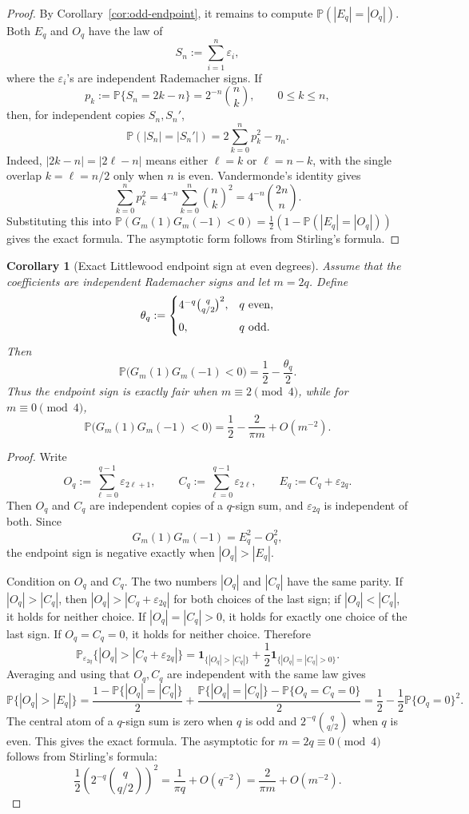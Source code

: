 \documentclass[11pt]{article}
\newtheorem{corollary}[theorem]{Corollary}
\newcommand{\PP}{\mathbb{P}}
\begin{document}
\begin{proof}
By Corollary~\ref{cor:odd-endpoint}, it remains to compute
\(\PP(|E_q|=|O_q|)\).  Both \(E_q\) and \(O_q\) have the law of
\[
S_n:=\sum_{i=1}^{n}\varepsilon_i,
\]
where the \(\varepsilon_i\)'s are independent Rademacher signs.  If
\[
p_k:=\PP\{S_n=2k-n\}=2^{-n}\binom nk,\qquad 0\le k\le n,
\]
then, for independent copies \(S_n,S_n'\),
\[
\PP(|S_n|=|S_n'|)
=2\sum_{k=0}^{n}p_k^2-\eta_n .
\]
Indeed, \(|2k-n|=|2\ell-n|\) means either \(\ell=k\) or \(\ell=n-k\), with the
single overlap \(k=\ell=n/2\) only when \(n\) is even.  Vandermonde's identity
gives
\[
\sum_{k=0}^{n}p_k^2
=4^{-n}\sum_{k=0}^{n}\binom nk^2
=4^{-n}\binom{2n}{n}.
\]
Substituting this into
\(\PP(G_m(1)G_m(-1)<0)=\tfrac12(1-\PP(|E_q|=|O_q|))\) gives the exact formula.
The asymptotic form follows from Stirling's formula.
\end{proof}

\begin{corollary}[Exact Littlewood endpoint sign at even degrees]\label{cor:littlewood-even}
Assume that the coefficients are independent Rademacher signs and let
\(m=2q\).  Define
\[
  \theta_q:=
  \begin{cases}
  4^{-q}\binom{q}{q/2}^{2},& q\ {\rm even},\\[2mm]
  0,& q\ {\rm odd}.
  \end{cases}
\]
Then
\[
\PP\bigl(G_m(1)G_m(-1)<0\bigr)=\frac12-\frac{\theta_q}{2}.
\]
Thus the endpoint sign is exactly fair when \(m\equiv2\pmod4\), while for
\(m\equiv0\pmod4\),
\[
\PP\bigl(G_m(1)G_m(-1)<0\bigr)
=\frac12-\frac{2}{\pi m}+O(m^{-2}).
\]
\end{corollary}

\begin{proof}
Write
\[
O_q:=\sum_{\ell=0}^{q-1}\varepsilon_{2\ell+1},\qquad
C_q:=\sum_{\ell=0}^{q-1}\varepsilon_{2\ell},\qquad
E_q:=C_q+\varepsilon_{2q}.
\]
Then \(O_q\) and \(C_q\) are independent copies of a \(q\)-sign sum, and
\(\varepsilon_{2q}\) is independent of both.  Since
\[
G_m(1)G_m(-1)=E_q^2-O_q^2,
\]
the endpoint sign is negative exactly when \(|O_q|>|E_q|\).

Condition on \(O_q\) and \(C_q\).  The two numbers \(|O_q|\) and \(|C_q|\) have
the same parity.  If \(|O_q|>|C_q|\), then
\(|O_q|>|C_q+\varepsilon_{2q}|\) for both choices of the last sign; if
\(|O_q|<|C_q|\), it holds for neither choice.  If \(|O_q|=|C_q|>0\), it holds
for exactly one choice of the last sign.  If \(O_q=C_q=0\), it holds for neither
choice.  Therefore
\[
\PP_{\varepsilon_{2q}}\{|O_q|>|C_q+\varepsilon_{2q}|\}
=\mathbf1_{\{|O_q|>|C_q|\}}
  +\frac12\mathbf1_{\{|O_q|=|C_q|>0\}} .
\]
Averaging and using that \(O_q,C_q\) are independent with the same law gives
\[
\PP\{|O_q|>|E_q|\}
=\frac{1-\PP\{|O_q|=|C_q|\}}2
  +\frac{\PP\{|O_q|=|C_q|\}-\PP\{O_q=C_q=0\}}2
=\frac12-\frac12\PP\{O_q=0\}^2.
\]
The central atom of a \(q\)-sign sum is zero when \(q\) is odd and
\(2^{-q}\binom{q}{q/2}\) when \(q\) is even.  This gives the exact formula.
The asymptotic for \(m=2q\equiv0\pmod4\) follows from Stirling's formula:
\[
\frac12\left(2^{-q}\binom{q}{q/2}\right)^2
=\frac1{\pi q}+O(q^{-2})
=\frac{2}{\pi m}+O(m^{-2}).
\]
\end{proof}
\end{document}

